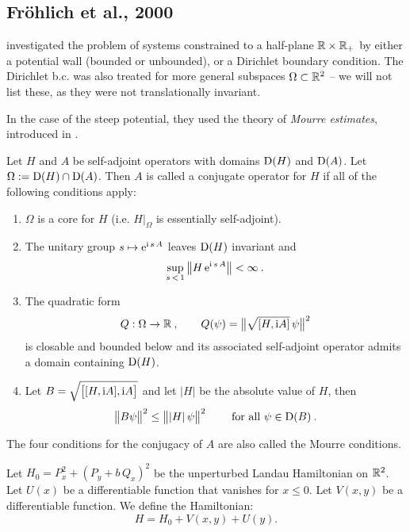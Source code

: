 \subsection{Fröhlich et al., 2000}
\citet{Frohlich2000} investigated the problem of systems constrained to a half-plane $\mathbb{R} \times \mathbb{R}_+$ by either a potential wall (bounded or unbounded), or a Dirichlet boundary condition. The Dirichlet b.c. was also treated for more general subspaces $\Omega \subset \mathbb{R}^2$ – we will not list these, as they were not translationally invariant.

In the case of the steep potential, they used the theory of \textit{Mourre estimates}, introduced in \citet{Mourre1981}.

\begin{defn}
    Let $H$ and $A$ be self-adjoint operators with domains $\mathrm{D}(H)$ and $\mathrm{D}(A)$. Let $\Omega := \mathrm{D}(H) \cap \mathrm{D}(A)$. Then $A$ is called a conjugate operator for $H$ if all of the following conditions apply:
    \begin{enumerate}
        \item $\Omega$ is a core for $H$ (i.e. $H|_\Omega$ is essentially self-adjoint).
        \item The unitary group $s \mapsto \mathrm{e}^{\mathrm{i} \, s \, A}$ leaves $\mathrm{D}(H)$ invariant and $$ \sup_{s\,<\,1} \big\lVert H \, \mathrm{e}^{\mathrm{i} \, s \, A} \big\rVert < \infty \: .$$
        \item The quadratic form $$Q: \Omega \to \mathbb{R} \: , \qquad Q(\psi) = \big\lVert  \sqrt{[ H, \mathrm{i} A ]} \, \psi  \big\rVert^2$$ is closable and bounded below and its associated self-adjoint operator admits a domain containing $\mathrm{D}(H)$.
        \item Let $B = \sqrt{\big[ [H, \mathrm{i} A], \mathrm{i} A \big]}$ and let $|H|$ be the absolute value of $H$, then $$\big\lVert  B \psi  \big\rVert^2 \leq \big\lVert  |H| \, \psi \big\rVert^2 \qquad \text{ for all } \psi \in \mathrm{D}(B) \: .$$
    \end{enumerate}
    The four conditions for the conjugacy of $A$ are also called the Mourre conditions.
\end{defn}

\begin{defn}
    Let $H_0 = P_x^2 + (P_y + b \, Q_x)^2$ be the unperturbed Landau Hamiltonian on $\mathbb{R}^2$. Let $U(x)$ be a differentiable function that vanishes for $x\leq 0$. Let $V(x,y)$ be a differentiable function. We define the Hamiltonian:
    $$ H = H_0 + V(x,y) + U(y). $$
\end{defn}

